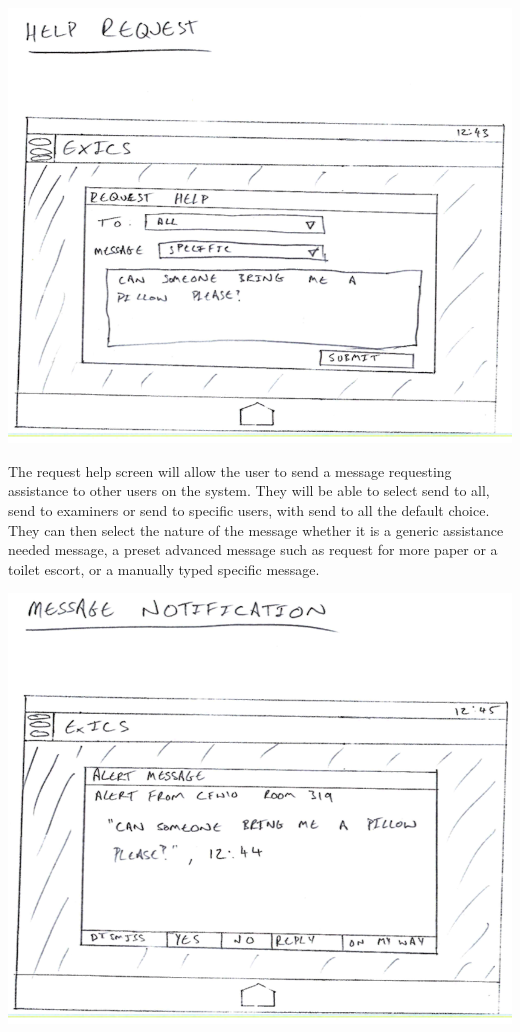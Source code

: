 \documentclass[a4paper, 12pt, notitlepage]{report}
\begin{document}
\includegraphics[width=\textwidth]{"GUI Sketches/Help Request Window Cropped"}

The request help screen will allow the user to send a message requesting assistance to other users on the system.  They will be able to select send to all, send to examiners or send to specific users, with send to all the default choice.  They can then select the nature of the message whether it is a generic assistance needed message, a preset advanced message such as request for more paper or a toilet escort, or a manually typed specific message.

\includegraphics[width=\textwidth]{"GUI Sketches/Message Notification Cropped"}
\end{document}
